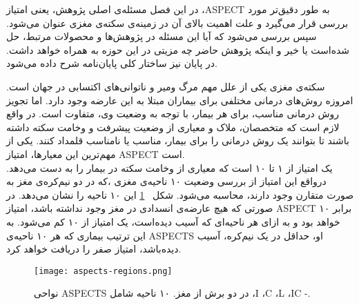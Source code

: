 

در این فصل مسئله‌ی اصلی پژوهش، یعنی امتیاز ،ASPECT به طور دقیق‌تر مورد بررسی قرار می‌گیرد و علت اهمیت بالای آن در زمینه‌ی سکته‌ی مغزی عنوان می‌شود.
سپس بررسی می‌شود که آیا این مسئله در پژوهش‌ها و محصولات مرتبط، حل شده‌است یا خیر و اینکه پژوهش حاضر چه مزیتی در این حوزه به همراه خواهد داشت.
در پایان نیز ساختار کلی پایان‌نامه شرح داده می‌شود.


سکته‌ی مغزی یکی از علل مهم مرگ ومیر و ناتوانی‌های اکتسابی در جهان است.
امروزه روش‌های درمانی مختلفی برای بیماران مبتلا به این عارضه وجود دارد.
اما تجویز روش درمانی مناسب، برای هر بیمار، با توجه به وضعیت وی، متفاوت است.
در واقع لازم است که متخصصان، ملاک و معیاری از وضعیت پیشرفت و وخامت سکته داشته باشند تا بتوانند یک روش درمانی را برای بیمار، مناسب یا نامناسب قلمداد کنند.
یکی از مهم‌ترین این معیارها، امتیاز ASPECT است.\\

 یک امتیاز از ۱ تا ۱۰ است که معیاری از وخامت سکته در بیمار را به دست می‌دهد.
درواقع این امتیاز از بررسی وضعیت ۱۰ ناحیه‌ی مغزی ،که در دو نیم‌کره‌ی مغز به صورت متقارن وجود دارند، محاسبه می‌شود.
شکل ~\ref{fig:aspects-regions} این ۱۰ ناحیه را نشان می‌دهد.
در صورتی که هیچ عارضه‌ی انسدادی در مغز وجود نداشته باشد، امتیاز ASPECT برابر ۱۰ خواهد بود و به ازای هر ناحیه‌ای که آسیب دیده‌است، یک امتیاز از ۱۰ کم می‌شود.
به این ترتیب بیماری که هر ۱۰ ناحیه‌ی ASPECTS او، حداقل در یک نیم‌کره، آسیب دیده‌باشد، امتیاز صفر را دریافت خواهد کرد.

\begin{figure}[ht]
    \centering
    \texttt{[image: aspects-regions.png]}
    \caption[]{نواحی ASPECTS در دو برش از مغز. ۱۰ ناحیه شامل ،I ،C ،L ،IC -.}
    \label{fig:aspects-regions}
\end{figure}


